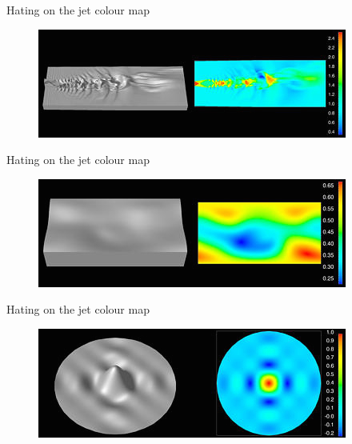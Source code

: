 \documentclass[10pt,presentation,compress]{beamer}
\begin{document}
\begin{frame}{Hating on the jet colour map}
  \begin{figure}[htp]
    \includegraphics[scale=0.75]{jetnoise.jpg}
  \end{figure}
\end{frame}

\begin{frame}{Hating on the jet colour map}
  \begin{figure}[htp]
    \includegraphics[scale=0.75]{magfield.jpg}
  \end{figure}
\end{frame}

\begin{frame}{Hating on the jet colour map}
  \begin{figure}[htp]
    \includegraphics[scale=0.75]{sinc.jpg}
  \end{figure}
\end{frame}
\end{document}
